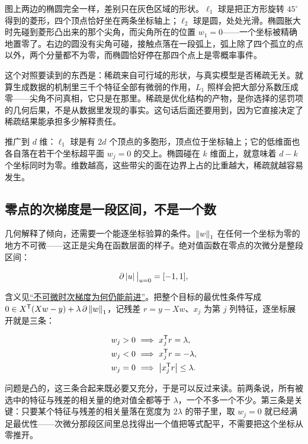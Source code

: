 图上两边的椭圆完全一样，差别只在灰色区域的形状。\(\ell_1\) 球是把正方形旋转 \(45^\circ\) 得到的菱形，四个顶点恰好坐在两条坐标轴上；\(\ell_2\) 球是圆，处处光滑。椭圆胀大时先碰到菱形凸出来的那个尖角，而尖角所在的位置 \(w_1=0\)——一个坐标被精确地置零了。右边的圆没有尖角可碰，接触点落在一段弧上，弧上除了四个孤立的点以外，两个分量都不为零，而椭圆恰好停在那四个点上是零概率事件。

这个对照要读到的东西是：稀疏来自可行域的形状，与真实模型是否稀疏无关。就算生成数据的机制里三千个特征全部有微弱的作用，\(L_1\) 照样会把大部分系数压成零——尖角不问真相，它只是在那里。稀疏是优化结构的产物，是你选择的惩罚项的几何后果，不是从数据里发现的事实。这句话后面还要用到，因为它直接决定了稀疏结果能承担多少解释责任。

推广到 \(d\) 维：\(\ell_1\) 球是有 \(2d\) 个顶点的多胞形，顶点位于坐标轴上；它的低维面也各自落在若干个坐标超平面 \(w_j=0\) 的交上。椭圆碰在 \(k\) 维面上，就意味着 \(d-k\) 个坐标同时为零。维数越高，这些带尖的面在边界上占的比重越大，稀疏就越容易发生。

\subsection{零点的次梯度是一段区间，不是一个数}

几何解释了倾向，还需要一个能逐坐标验算的条件。\(\left\lVert w\right\rVert_1\) 在任何一个坐标为零的地方不可微——这正是尖角在函数层面的样子。绝对值函数在零点的次微分是整段区间：

\[
\partial\left|u\right|\big|_{u=0}=[-1,1],
\]

含义见\hyperref[sec:09-Convex-Optimization/06-Optimization-Algorithms/03]{``不可微时次梯度为何仍能前进''}。把整个目标的最优性条件写成 \(0\in X^{\mathsf{T}}(Xw-y)+\lambda\,\partial\left\lVert w\right\rVert_1\)，记残差 \(r=y-Xw\)、\(x_j\) 为第 \(j\) 列特征，逐坐标展开就是三条：

\[
\begin{aligned}
w_j>0 &\ \Longrightarrow\ x_j^{\mathsf{T}}r=\lambda,\\
w_j<0 &\ \Longrightarrow\ x_j^{\mathsf{T}}r=-\lambda,\\
w_j=0 &\ \Longrightarrow\ \left|x_j^{\mathsf{T}}r\right|\le\lambda .
\end{aligned}
\]

问题是凸的，这三条合起来既必要又充分，于是可以反过来读。前两条说，所有被选中的特征与残差的相关量的绝对值全都等于 \(\lambda\)，一个不多一个不少。第三条是关键：只要某个特征与残差的相关量落在宽度为 \(2\lambda\) 的带子里，取 \(w_j=0\) 就已经满足最优性——次微分那段区间里总找得出一个值把等式配平，不需要把这个坐标从零推开。

